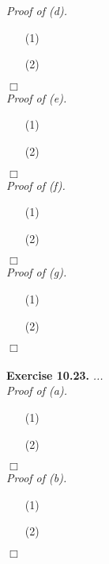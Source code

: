\documentclass{article}
\begin{document}
\emph{Proof of (d).}
\begin{enumerate}
\item[(1)]
\item[(2)]

\end{enumerate}
$\Box$ \\



\emph{Proof of (e).}
\begin{enumerate}
\item[(1)]
\item[(2)]

\end{enumerate}
$\Box$ \\



\emph{Proof of (f).}
\begin{enumerate}
\item[(1)]
\item[(2)]

\end{enumerate}
$\Box$ \\



\emph{Proof of (g).}
\begin{enumerate}
\item[(1)]
\item[(2)]

\end{enumerate}
$\Box$ \\\\






\textbf{Exercise 10.23.}
\emph{...} \\



\emph{Proof of (a).}
\begin{enumerate}
\item[(1)]
\item[(2)]

\end{enumerate}
$\Box$ \\



\emph{Proof of (b).}
\begin{enumerate}
\item[(1)]
\item[(2)]

\end{enumerate}
$\Box$ \\
\end{document}
